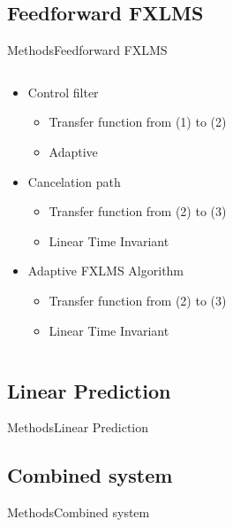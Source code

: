 \subsection{Feedforward FXLMS}
\begin{frame}{Methods}{Feedforward FXLMS}
		\begin{columns}
			\begin{column}{0.5\textwidth}
			\begin{itemize}
				\item Control filter
				\begin{itemize}
					\item Transfer function from (1) to (2)
					\item Adaptive
				\end{itemize}
				\item Cancelation path
				\begin{itemize}
					\item Transfer function from (2) to (3)
					\item Linear Time Invariant 
				\end{itemize}
				\item Adaptive FXLMS Algorithm
				\begin{itemize}
					\item Transfer function from (2) to (3)
					\item Linear Time Invariant 
				\end{itemize}
			\end{itemize}
			\end{column}
			\begin{column}{0.5\textwidth} 
			\resizebox{1.1\columnwidth}{!}{		
			}
			\end{column}
		\end{columns}

\end{frame}


\subsection{Linear Prediction}
\begin{frame}{Methods}{Linear Prediction}		

\end{frame}

\subsection{Combined system}
\begin{frame}{Methods}{Combined system}		

\end{frame}

